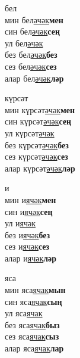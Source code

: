 \begin{multicols}{4}
\begin{enumerate}
\begin{minipage}{\linewidth}
    \item
    бел\\
    мин бел\underline{әчәк}\textbf{мен}\\
    син бел\underline{әчәк}\textbf{сең}\\
    ул бел\underline{әчәк}\\
    без бел\underline{әчәк}\textbf{без}\\
    сез бел\underline{әчәк}\textbf{сез}\\
    алар бел\underline{әчәк}\textbf{ләр}\\
\end{minipage}

\begin{minipage}{\linewidth}
    \item
    күрсәт\\
    мин күрсәт\underline{әчәк}\textbf{мен}\\
    син күрсәт\underline{әчәк}\textbf{сең}\\
    ул күрсәт\underline{әчәк}\\
    без күрсәт\underline{әчәк}\textbf{без}\\
    сез күрсәт\underline{әчәк}\textbf{сез}\\
    алар күрсәт\underline{әчәк}\textbf{ләр}\\
\end{minipage}

\begin{minipage}{\linewidth}
    \item
    и\\
    мин и\underline{ячәк}\textbf{мен}\\
    син и\underline{ячәк}\textbf{сең}\\
    ул и\underline{ячәк}\\
    без и\underline{ячәк}\textbf{без}\\
    сез и\underline{ячәк}\textbf{сез}\\
    алар и\underline{ячәк}\textbf{ләр}\\
\end{minipage}

\begin{minipage}{\linewidth}
    \item
    яса\\
    мин яса\underline{ячак}\textbf{мын}\\
    син яса\underline{ячак}\textbf{сың}\\
    ул яса\underline{ячак}\\
    без яса\underline{ячак}\textbf{быз}\\
    сез яса\underline{ячак}\textbf{сыз}\\
    алар яса\underline{ячак}\textbf{лар}\\
\end{minipage}


\end{enumerate}
\end{multicols}

